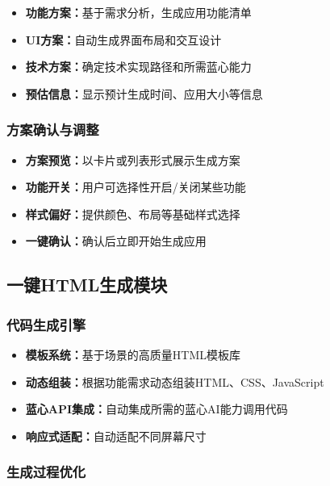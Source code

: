 \documentclass[a4paper,12pt]{ctexart}
\begin{document}
\begin{itemize}[leftmargin=2em]
    \item \textbf{功能方案：}基于需求分析，生成应用功能清单
    \item \textbf{UI方案：}自动生成界面布局和交互设计
    \item \textbf{技术方案：}确定技术实现路径和所需蓝心能力
    \item \textbf{预估信息：}显示预计生成时间、应用大小等信息
\end{itemize}

\subsubsection{方案确认与调整}

\begin{itemize}[leftmargin=2em]
    \item \textbf{方案预览：}以卡片或列表形式展示生成方案
    \item \textbf{功能开关：}用户可选择性开启/关闭某些功能
    \item \textbf{样式偏好：}提供颜色、布局等基础样式选择
    \item \textbf{一键确认：}确认后立即开始生成应用
\end{itemize}

\subsection{一键HTML生成模块}

\subsubsection{代码生成引擎}

\begin{itemize}[leftmargin=2em]
    \item \textbf{模板系统：}基于场景的高质量HTML模板库
    \item \textbf{动态组装：}根据功能需求动态组装HTML、CSS、JavaScript
    \item \textbf{蓝心API集成：}自动集成所需的蓝心AI能力调用代码
    \item \textbf{响应式适配：}自动适配不同屏幕尺寸
\end{itemize}

\subsubsection{生成过程优化}
\end{document}
